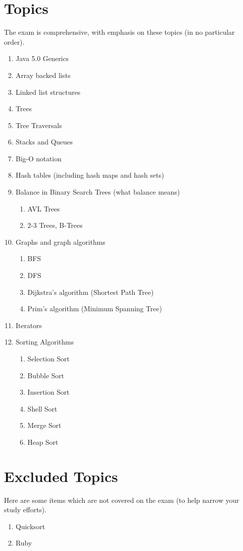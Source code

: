 \documentclass[10pt]{article}
\begin{document}
\section{Topics}
The exam is comprehensive, with emphasis on these topics (in no particular order).
\begin{enumerate}
	\item Java 5.0 Generics
	\item Array backed lists
	\item Linked list structures
	\item Trees
	\item Tree Traversals
	\item Stacks and Queues
	\item Big-O notation
	\item Hash tables (including hash maps and hash sets)
	\item Balance in Binary Search Trees (what balance means)
	\begin{enumerate}
		\item AVL Trees
		\item 2-3 Trees, B-Trees
	\end{enumerate}
	\item Graphs and graph algorithms
	\begin{enumerate}
		\item BFS
		\item DFS
		\item Dijkstra's algorithm (Shortest Path Tree)
		\item Prim's algorithm (Minimum Spanning Tree)
	\end{enumerate}
	\item Iterators
	\item Sorting Algorithms
	\begin{enumerate}
		\item Selection Sort
		\item Bubble Sort
		\item Insertion Sort
		\item Shell Sort
		\item Merge Sort
		\item Heap Sort
	\end{enumerate}
\end{enumerate}

\section{Excluded Topics}
Here are some items which are not covered on the exam (to help narrow your study efforts).
\begin{enumerate}
	\item Quicksort
	\item Ruby
\end{enumerate}
\end{document}
